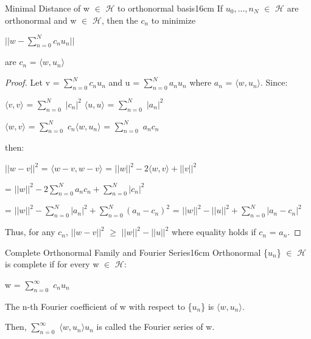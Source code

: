    \vspace{0.5cm}



    \begin{wtheorem}{Minimal Distance of w $\in$ $\mathcal{H}$
    to orthonormal basis}{16cm}
        If $u_0,...,n_N$ $\in$ $\mathcal{H}$ are orthonormal
        and w $\in$ $\mathcal{H}$, then the $c_n$ to minimize

        \hspace{0.5cm}
        $|| w - \sum_{n=0}^N c_nu_n ||$

        are $c_n$ = $\langle w , u_n \rangle$
    \end{wtheorem}

    \begin{proof}
        Let v = $\sum_{n=0}^N c_nu_n$ and u = $\sum_{n=0}^N a_nu_n$
        where $a_n$ = $\langle w , u_n \rangle$. Since:

        \hspace{0.5cm}
        $\langle v , v \rangle$
        = $\sum_{n=0}^N$ $|c_n|^2$
        \hspace{1cm}
        $\langle u , u \rangle$
        = $\sum_{n=0}^N$ $|a_n|^2$

        \hspace{0.5cm}
        $\langle w , v \rangle$
        = $\sum_{n=0}^N$ $c_n \langle w , u_n \rangle$
        = $\sum_{n=0}^N$ $a_nc_n$

        then:

        \hspace{0.5cm}
        $||w-v||^2$
        = $\langle w-v , w-v \rangle$
        = $||w||^2 - 2 \langle w , v \rangle + ||v||^2$

        \hspace{2.3cm}
        = $||w||^2 - 2 \sum_{n=0}^N a_nc_n + \sum_{n=0}^N |c_n|^2$
        
        \hspace{2.3cm}
        = $||w||^2 - \sum_{n=0}^N |a_n|^2 + \sum_{n=0}^N (a_n-c_n)^2$
        = $||w||^2 - ||u||^2 + \sum_{n=0}^N |a_n-c_n|^2$

        Thus, for any $c_n$,
        $||w-v||^2$
        $\geq$ $||w||^2 - ||u||^2$
        where equality holds if $c_n$ = $a_n$.
    \end{proof}

    \vspace{0.5cm}



    \begin{definition}{Complete Orthonormal Family and Fourier Series}{16cm}
        Orthonormal \{$u_n$\} $\in$ $\mathcal{H}$ is {\color{lblue} complete}
        if for every w $\in$ $\mathcal{H}$:

        \hspace{0.5cm}
        w = $\sum_{n=0}^{\infty}$ $c_n u_n$

        The n-th Fourier coefficient of w with respect to \{$u_n$\}
        is $\langle w , u_n \rangle$.

        Then, $\sum_{n=0}^{\infty}$ $\langle w , u_n \rangle u_n$
        is called the {\color{lblue} Fourier series of w}.
    \end{definition}

